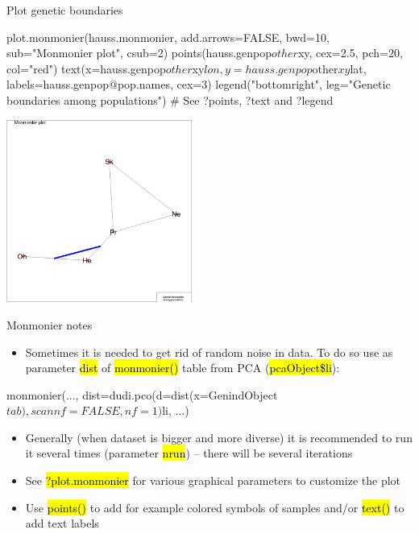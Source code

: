 \documentclass[compress, ucs, xelatex, 11pt, xcolor=svgnames,
  hyperref={
    bookmarks=true,
    unicode=true,
    colorlinks=true,
    pdftitle={Molecular data in R},
    plainpages=false,
    pdfauthor={Vojtech Zeisek},
    pdfsubject={Course about phylogeny and evolution in R},
    pdfcreator={XeLaTeX},
    pdfkeywords={R, evolution, phylogeny, molecular data},
    linkcolor=Tomato,
    anchorcolor=SaddleBrown,
    citecolor=Goldenrod,
    filecolor=DarkMagenta,
    menucolor=Sienna,
    urlcolor=DarkTurquoise,
    pdftex},
  url={hyphens, lowtilde} %
  ]{beamer}
\renewcommand{\texttt}[1]{\hl{\ttfamily #1}}
\begin{document}
\begin{frame}[fragile]{Plot genetic boundaries}
\begin{multicols}{2}
  \begin{spluscode}
    plot.monmonier(hauss.monmonier,
      add.arrows=FALSE, bwd=10,
      sub="Monmonier plot", csub=2)
    points(hauss.genpop$other$xy,
      cex=2.5, pch=20, col="red")
    text(x=hauss.genpop$other$xy$lon,
      y=hauss.genpop$other$xy$lat,
      labels=hauss.genpop@pop.names,
      cex=3)
    legend("bottomright",
      leg="Genetic boundaries\n
      among populations")
    # See ?points, ?text and ?legend
  \end{spluscode}
  \includegraphics[height=6cm]{monmonier.png}
\end{multicols}
\end{frame}

\begin{frame}[fragile]{Monmonier notes}
\begin{itemize}
 \item Sometimes it is needed to get rid of random noise in data. To do so use as parameter \texttt{dist} of \texttt{monmonier()} table from PCA (\texttt{pcaObject\$li}):
\end{itemize}
  \begin{spluscode}
    monmonier(..., dist=dudi.pco(d=dist(x=GenindObject$tab),
      scannf=FALSE, nf=1)$li, ...)
  \end{spluscode}
\begin{itemize}
 \item Generally (when dataset is bigger and more diverse) it is recommended to run it several times (parameter \texttt{nrun}) -- there will be several iterations
 \item See \texttt{?plot.monmonier} for various graphical parameters to customize the plot
 \item Use \texttt{points()} to add for example colored symbols of samples and/or \texttt{text()} to add text labels
\end{itemize}
\end{frame}
\end{document}
